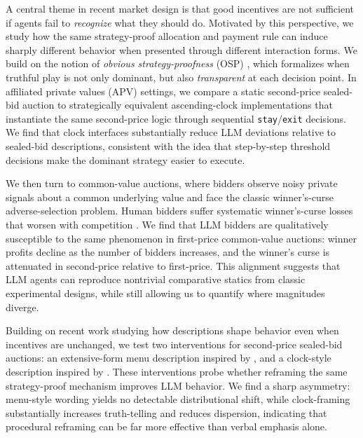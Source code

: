 A central theme in recent market design is that good incentives are not sufficient if agents fail to \emph{recognize} what they should do. Motivated by this perspective, we study how the same strategy-proof allocation and payment rule can induce sharply different behavior when presented through different interaction forms. We build on the notion of \emph{obvious strategy-proofness} (OSP) \citep{li2017obviously}, which formalizes when truthful play is not only dominant, but also \emph{transparent} at each decision point. In affiliated private values (APV) settings, we compare a static second-price sealed-bid auction to strategically equivalent ascending-clock implementations that instantiate the same second-price logic through sequential \texttt{stay}/\texttt{exit} decisions. We find that clock interfaces substantially reduce LLM deviations relative to sealed-bid descriptions, consistent with the idea that step-by-step threshold decisions make the dominant strategy easier to execute\citep{breitmoser2022obviousness, li2017obviously}.

We then turn to common-value auctions, where bidders observe noisy private signals about a common underlying value and face the classic winner’s-curse adverse-selection problem. Human bidders suffer systematic winner’s-curse losses that worsen with competition \citep{kagel1986winner}. We find that LLM bidders are qualitatively susceptible to the same phenomenon in first-price common-value auctions: winner profits decline as the number of bidders increases, and the winner’s curse is attenuated in second-price relative to first-price. This alignment suggests that LLM agents can reproduce nontrivial comparative statics from classic experimental designs, while still allowing us to quantify where magnitudes diverge.

Building on recent work studying how descriptions shape behavior even when incentives are unchanged, we test two interventions for second-price sealed-bid auctions: an extensive-form menu description inspired by \citet{gonczarowski2023strategyproofness}, and a clock-style description inspired by \citet{breitmoser2022obviousness}. These interventions probe whether reframing the same strategy-proof mechanism improves LLM behavior. We find a sharp asymmetry: menu-style wording yields no detectable distributional shift, while clock-framing substantially increases truth-telling and reduces dispersion, indicating that procedural reframing can be far more effective than verbal emphasis alone.

